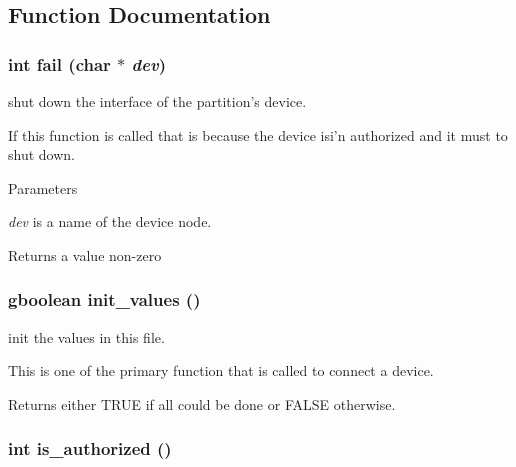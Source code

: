 \subsection{Function Documentation}
\hypertarget{usb-control_8h_ab9932ed1777b7d0acf1e366fdd73ef3e}{
\subsubsection[{fail}]{\setlength{\rightskip}{0pt plus 5cm}int fail (char $\ast$ {\em dev})}}
\label{usb-control_8h_ab9932ed1777b7d0acf1e366fdd73ef3e}


shut down the interface of the partition's device. 

If this function is called that is because the device isi'n authorized and it must to shut down. 
\begin{DoxyParams}{Parameters}
\item[{\em dev}]is a name of the device node. \end{DoxyParams}
\begin{DoxyReturn}{Returns}
a value non-\/zero 
\end{DoxyReturn}
\hypertarget{usb-control_8h_abc3e9b8557ead2451394660134b421f7}{
\subsubsection[{init\_\-values}]{\setlength{\rightskip}{0pt plus 5cm}gboolean init\_\-values ()}}
\label{usb-control_8h_abc3e9b8557ead2451394660134b421f7}


init the values in this file. 

This is one of the primary function that is called to connect a device. \begin{DoxyReturn}{Returns}
either TRUE if all could be done or FALSE otherwise. 
\end{DoxyReturn}
\hypertarget{usb-control_8h_a07d78dafcde5f5109f5cebe323b1d401}{
\subsubsection[{is\_\-authorized}]{\setlength{\rightskip}{0pt plus 5cm}int is\_\-authorized ()}}
\label{usb-control_8h_a07d78dafcde5f5109f5cebe323b1d401}


